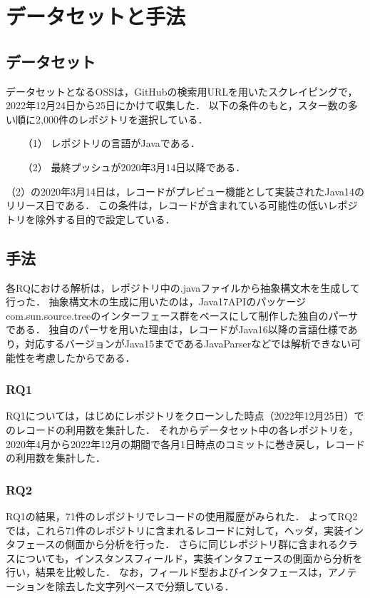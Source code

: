 \section{データセットと手法\label{methodology}}

\subsection{データセット}
データセットとなるOSSは，GitHubの検索用URLを用いたスクレイピングで，2022年12月24日から25日にかけて収集した．
以下の条件のもと，スター数の多い順に2,000件のレポジトリを選択している．
\begin{itemize}
    \item[（1） ] レポジトリの言語がJavaである．
    \item[（2） ] 最終プッシュが2020年3月14日以降である．
\end{itemize}
（2）の2020年3月14日は，レコードがプレビュー機能として実装されたJava14のリリース日である．
この条件は，レコードが含まれている可能性の低いレポジトリを除外する目的で設定している．

\subsection{手法}
各RQにおける解析は，レポジトリ中の.javaファイルから抽象構文木を生成して行った．
抽象構文木の生成に用いたのは，Java17APIのパッケージcom.sun.source.treeのインターフェース群をベースにして制作した独自のパーサである．
独自のパーサを用いた理由は，レコードがJava16以降の言語仕様であり，対応するバージョンがJava15までであるJavaParserなどでは解析できない可能性を考慮したからである．

\subsubsection{RQ1\label{rq1_method}}
RQ1については，はじめにレポジトリをクローンした時点（2022年12月25日）でのレコードの利用数を集計した．
それからデータセット中の各レポジトリを，2020年4月から2022年12月の期間で各月1日時点のコミットに巻き戻し，レコードの利用数を集計した．

\subsubsection{RQ2\label{rq2_method}}
RQ1の結果，71件のレポジトリでレコードの使用履歴がみられた．
よってRQ2では，これら71件のレポジトリに含まれるレコードに対して，ヘッダ，実装インタフェースの側面から分析を行った．
さらに同じレポジトリ群に含まれるクラスについても，インスタンスフィールド，実装インタフェースの側面から分析を行い，結果を比較した．
なお，フィールド型およびインタフェースは，アノテーションを除去した文字列ベースで分類している．

